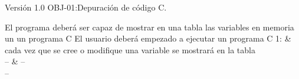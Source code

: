 {Versión 1.0}
{OBJ-01:Depuración de código C.}
{\item{}
\item{}
\item{}}
{El programa deberá ser capaz de mostrar en una tabla las variables en memoria un un programa C}
{El usuario deberá empezado a ejecutar un programa C}
{{1: & cada vez que se cree o modifique una variable se mostrará en la tabla \\}
{-- & --\\}}
{--}